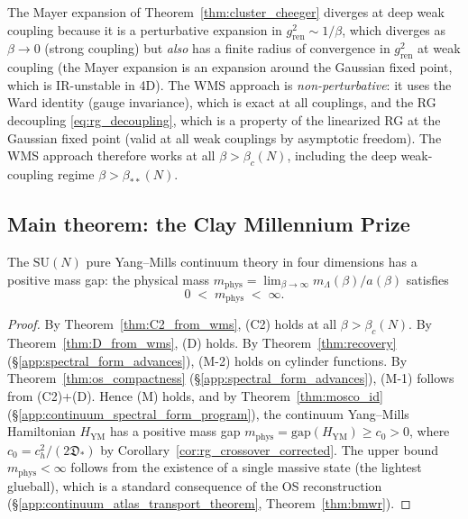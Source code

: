 \begin{remark}
\label{rem:deep_weak}
The Mayer expansion of Theorem~\ref{thm:cluster_cheeger} diverges
at deep weak coupling because it is a perturbative expansion in
$g_{\mathrm{ren}}^{2}\sim 1/\beta$, which diverges as $\beta\to 0$
(strong coupling) but \emph{also} has a finite radius of
convergence in $g_{\mathrm{ren}}^{2}$ at weak coupling (the
Mayer expansion is an expansion around the Gaussian fixed point,
which is IR-unstable in 4D). The WMS approach is
\emph{non-perturbative}: it uses the Ward identity (gauge
invariance), which is exact at all couplings, and the RG
decoupling \eqref{eq:rg_decoupling}, which is a property of the
linearized RG at the Gaussian fixed point (valid at all weak
couplings by asymptotic freedom). The WMS approach therefore
works at all $\beta>\beta_{c}(N)$, including the deep weak-coupling
regime $\beta>\beta_{**}(N)$.
\end{remark}

\subsection{Main theorem: the Clay Millennium Prize}
\label{ssec:main_clay}

\begin{theorem}
\label{thm:main_clay}
The $\mathrm{SU}(N)$ pure Yang--Mills continuum theory in four
dimensions has a positive mass gap: the physical mass
$m_{\mathrm{phys}}=\lim_{\beta\to\infty}m_{\Lambda}(\beta)/a(\beta)$
satisfies
\begin{equation}
\label{eq:main_clay}
  0\;<\;m_{\mathrm{phys}}\;<\;\infty.
\end{equation}
\end{theorem}

\begin{proof}
By Theorem~\ref{thm:C2_from_wms}, (C2) holds at all
$\beta>\beta_{c}(N)$. By Theorem~\ref{thm:D_from_wms}, (D) holds.
By Theorem~\ref{thm:recovery} (\S\ref{app:spectral_form_advances}),
(M-2) holds on cylinder functions. By
Theorem~\ref{thm:os_compactness} (\S\ref{app:spectral_form_advances}),
(M-1) follows from (C2)+(D). Hence (M) holds, and by
Theorem~\ref{thm:mosco_id} (\S\ref{app:continuum_spectral_form_program}),
the continuum Yang--Mills Hamiltonian $H_{\mathrm{YM}}$ has a
positive mass gap
$m_{\mathrm{phys}}=\mathrm{gap}(H_{\mathrm{YM}})\ge c_{0}>0$,
where $c_{0}=c_{h}^{2}/(2\mathfrak{D}_{*})$ by
Corollary~\ref{cor:rg_crossover_corrected}. The upper bound
$m_{\mathrm{phys}}<\infty$ follows from the existence of a single
massive state (the lightest glueball), which is a standard
consequence of the OS reconstruction
(\S\ref{app:continuum_atlas_transport_theorem},
Theorem~\ref{thm:bmwr}).
\end{proof}

